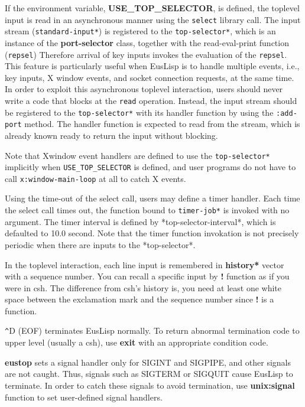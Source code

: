 If the environment variable, {\bf USE\_TOP\_SELECTOR}, is defined,
the toplevel input is read in an asynchronous manner using the {\tt select} 
library call.
The input stream ({\tt *standard-input*}) is registered to
the {\tt *top-selector*},
which is an instance of the {\bf port-selector} class,
together with the read-eval-print function ({\tt repsel})
Therefore arrival of key inputs invokes the evaluation of the {\tt repsel}.
This feature is particularly useful when EusLisp is to handle
multiple events, i.e., key inputs, X window events, and socket connection
requests, at the same time.
In order to exploit this asynchronous toplevel interaction,
users should never write a code that blocks  at  the {\tt read} operation.
Instead, the input stream should be registered to the {\tt *top-selector*}
with its handler function by using the {\tt :add-port} method.
The handler function is expected to read from the stream,
which is already known ready to return the input without blocking.

Note that Xwindow event handlers are defined to use the {\tt *top-selector*}
implicitly when {\tt USE\_TOP\_SELECTOR} is defined, and user programs do not
have to call {\tt x:window-main-loop} at all to catch X events.

Using the time-out of the select call, users may define a timer handler.
Each time the select call times out, the function
bound to {\tt *timer-job*} is invoked with no argument.
The timer interval is defined by *top-selector-interval*, which is 
defaulted to 10.0 second.
Note that the timer function invokation is not precisely periodic
when there are inputs to the *top-selector*.

In the toplevel interaction,
each line input is remembered in {\bf *history*} vector with a sequence
number.
You can recall a specific input by {\bf !} function
as if you were in csh.
The difference from csh's history is, you need at least one white space
between the exclamation mark and the sequence number since {\bf !}
is a function.

\verb+^+D (EOF) terminates EusLisp normally.
To return abnormal termination code to upper level (usually a csh),
use {\bf exit} with an appropriate condition code.

{\bf eustop} sets a signal handler only for SIGINT and SIGPIPE,
and other signals are not caught.
Thus, signals such as SIGTERM or SIGQUIT cause EusLisp to terminate.
In order to catch these signals to avoid termination,
use {\bf unix:signal} function to set user-defined signal handlers.

